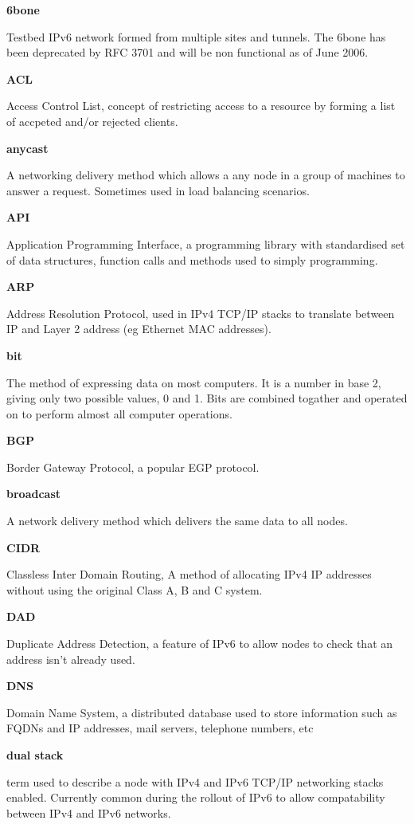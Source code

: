 \textbf{6bone}

Testbed IPv6 network formed from multiple sites and tunnels. The 6bone
has been deprecated by RFC 3701 and will be non functional as of June
2006.

\textbf{ACL}

Access Control List, concept of restricting access to a resource by
forming a list of accpeted and/or rejected clients.

\textbf{anycast}

A networking delivery method which allows a any node in a group of 
machines to answer a request. Sometimes used in load balancing 
scenarios.

\textbf{API}

Application Programming Interface, a programming library with
standardised set of data structures, function calls and methods used to
simply programming.

\textbf{ARP}

Address Resolution Protocol, used in IPv4 TCP/IP stacks to translate 
between IP and Layer 2 address (eg Ethernet MAC addresses).

\textbf{bit}

The method of expressing data on most computers. It is a number in base
2, giving only two possible values, 0 and 1. Bits are combined togather
and operated on to perform almost all computer operations.

\textbf{BGP}

Border Gateway Protocol, a popular EGP protocol.  

\textbf{broadcast}

A network delivery method which delivers the same data to all nodes.

\textbf{CIDR}

Classless Inter Domain Routing, A method of allocating IPv4 IP addresses
without using the original Class A, B and C system.

\textbf{DAD}

Duplicate Address Detection, a feature of IPv6 to allow nodes to check
that an address isn't already used.

\textbf{DNS}

Domain Name System, a distributed database used to store information
such as FQDNs and IP addresses, mail servers, telephone numbers, etc

\textbf{dual stack}

term used to describe a node with IPv4 and IPv6 TCP/IP networking stacks
enabled. Currently common during the rollout of IPv6 to allow
compatability between IPv4 and IPv6 networks.

